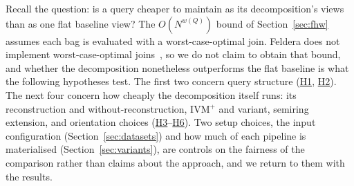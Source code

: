 Recall the question: is a query cheaper to maintain as its decomposition's views than as one flat baseline view? The $O(N^{w(Q)})$ bound of Section~\ref{sec:fhw} assumes each bag is evaluated with a worst-case-optimal join. Feldera does not implement worst-case-optimal joins~\cite{budiu2023DBSP}, so we do not claim to obtain that bound, and whether the decomposition nonetheless outperforms the flat baseline is what the following hypotheses test. The first two concern query structure (\hyperlink{h1}{H1}, \hyperlink{h2}{H2}). The next four concern how cheaply the decomposition itself runs: its reconstruction and without-reconstruction, IVM$^+$ and variant, semiring extension, and orientation choices (\hyperlink{h3}{H3}--\hyperlink{h6}{H6}). Two setup choices, the input configuration (Section~\ref{sec:datasets}) and how much of each pipeline is materialised (Section~\ref{sec:variants}), are controls on the fairness of the comparison rather than claims about the approach, and we return to them with the results.


